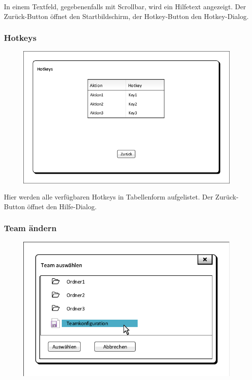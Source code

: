 In einem Textfeld, gegebenenfalls mit Scrollbar, wird ein Hilfetext angezeigt. Der \glqq{}Zurück\grqq{}-Button öffnet den Startbildschirm, der \glqq{}Hotkey\grqq{}-Button den Hotkey-Dialog.

\subsubsection{Hotkeys}
\begin{figure}[H]
    \centering
    \includegraphics[scale=0.8]{../Meilenstein03/images/Hotkeys.pdf}
\end{figure}

Hier werden alle verfügbaren Hotkeys in Tabellenform aufgelistet. Der \glqq{}Zurück\grqq{}-Button öffnet den Hilfe-Dialog.

\subsubsection{Team ändern}
\begin{figure}[H]
    \centering
    \includegraphics[scale=0.8]{../Meilenstein03/images/Teamauswahl_Popup.pdf}
\end{figure}

